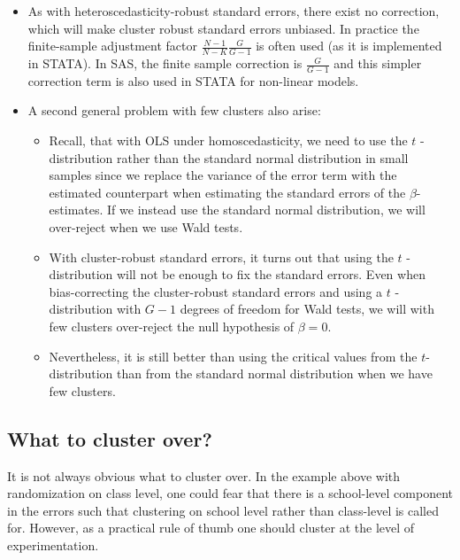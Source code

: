 \documentclass{article}
\begin{document}
\begin{itemize}
\item As with heteroscedasticity-robust standard errors, there exist no
correction, which will make cluster robust standard errors unbiased. In
practice the finite-sample adjustment factor $\frac{N-1}{N-K}\frac{G}{G-1}$
is often used (as it is implemented in STATA). In SAS, the finite sample
correction is $\frac{G}{G-1}$ and this simpler correction term is also used
in STATA for non-linear models.

\item A second general problem with few clusters also arise:

\begin{itemize}
\item Recall, that with OLS under homoscedasticity, we need to use the $t$%
-distribution rather than the standard normal distribution in small samples
since we replace the variance of the error term with the estimated
counterpart when estimating the standard errors of the $\beta $-estimates.
If we instead use the standard normal distribution, we will over-reject when
we use Wald tests.

\item With cluster-robust standard errors, it turns out that using the $t$%
-distribution will not be enough to fix the standard errors. Even when
bias-correcting the cluster-robust standard errors and using a $t$%
-distribution with $G-1$ degrees of freedom for Wald tests, we will with few
clusters over-reject the null hypothesis of $\beta =0$.

\item Nevertheless, it is still better than using the critical values from
the $t$-distribution than from the standard normal distribution when we have
few clusters.
\end{itemize}
\end{itemize}

\subsection{What to cluster over?}

It is not always obvious what to cluster over. In the example above with
randomization on class level, one could fear that there is a school-level
component in the errors such that clustering on school level rather than
class-level is called for. However, as a practical rule of thumb one should
cluster at the level of experimentation.
\end{document}
